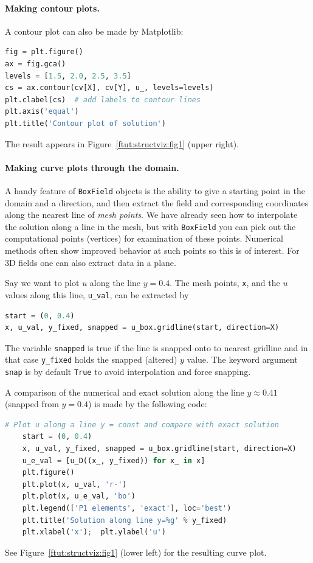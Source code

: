 \documentclass[graybox,envcountchap,sectrefs,final]{svmonodo}
\begin{document}

\paragraph{Making contour plots.}
A contour plot can also be made by Matplotlib:

\begin{lstlisting}[language=Python,style=graycolor]
fig = plt.figure()
ax = fig.gca()
levels = [1.5, 2.0, 2.5, 3.5]
cs = ax.contour(cv[X], cv[Y], u_, levels=levels)
plt.clabel(cs)  # add labels to contour lines
plt.axis('equal')
plt.title('Contour plot of solution')
\end{lstlisting}
The result appears in Figure~\ref{ftut:structviz:fig1} (upper right).

\paragraph{Making curve plots through the domain.}
A handy feature of \texttt{BoxField} objects is the ability to give a starting
point in the domain and a direction, and then extract the field and
corresponding coordinates along the nearest line of \emph{mesh points}. We have
already seen how to interpolate the solution along a line in the mesh, but
with \texttt{BoxField} you can pick out the computational points (vertices) for
examination of these points. Numerical methods often show improved behavior
at such points so this is of interest. For 3D fields
one can also extract data in a plane.

Say we want to plot $u$ along
the line $y=0.4$. The mesh points, \texttt{x}, and the $u$ values
along this line, \Verb!u_val!, can be extracted by

\begin{lstlisting}[language=Python,style=graycolor]
start = (0, 0.4)
x, u_val, y_fixed, snapped = u_box.gridline(start, direction=X)
\end{lstlisting}
The variable \texttt{snapped} is true if the line is snapped onto to nearest
gridline and in that case \Verb!y_fixed! holds the snapped
(altered) $y$ value. The keyword argument \texttt{snap} is by default \texttt{True}
to avoid interpolation and force snapping.

A comparison of the numerical and exact solution along the line
$y\approx 0.41$ (snapped from $y=0.4$) is made by the following code:

\begin{lstlisting}[language=Python,style=graycolor]
    # Plot u along a line y = const and compare with exact solution
    start = (0, 0.4)
    x, u_val, y_fixed, snapped = u_box.gridline(start, direction=X)
    u_e_val = [u_D((x_, y_fixed)) for x_ in x]
    plt.figure()
    plt.plot(x, u_val, 'r-')
    plt.plot(x, u_e_val, 'bo')
    plt.legend(['P1 elements', 'exact'], loc='best')
    plt.title('Solution along line y=%g' % y_fixed)
    plt.xlabel('x');  plt.ylabel('u')
\end{lstlisting}
See Figure~\ref{ftut:structviz:fig1} (lower left) for the resulting curve plot.
\end{document}
